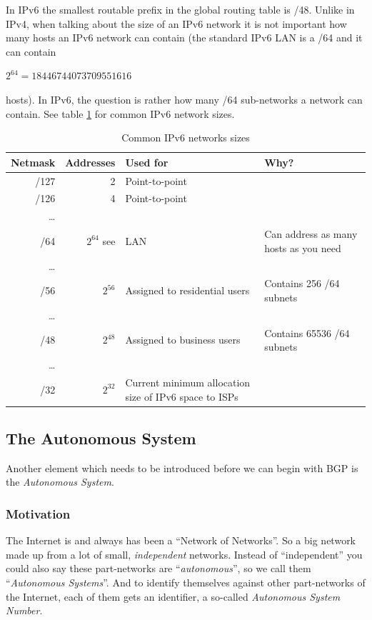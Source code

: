 In IPv6 the smallest routable prefix in the \gls{global routing table} is /48. Unlike in IPv4,
when talking about the size of an IPv6 network it is not important how many hosts
an IPv6 network can contain (the standard IPv6 LAN is a /64 and it can
contain
\begin{center}
  \(2^{64} = 18446744073709551616\)
\end{center}
hosts). In IPv6, the question is rather how many /64
sub-networks a network can contain. See table \ref{tab:ipv6sizes} for common IPv6
network sizes.
\begin{table}[hbp]
  \caption{Common IPv6 networks sizes}
  \label{tab:ipv6sizes}
  \begin{tabularx}{\textwidth}{rrXX}
    \textbf{Netmask} & \textbf{Addresses} & \textbf{Used for} & \textbf{Why?}\\
    \hline
    /127 & 2 & Point-to-point \\
    /126 & 4 & Point-to-point \\
    \ldots \\
    /64 & \(2^{64}\) see\footnotemark[1]& LAN & Can address as many
      hosts as you need\\
    \ldots \\
    /56 & \(2^{56}\) & Assigned to residential users & Contains 256 /64 subnets \\
    \ldots \\
    /48 & \(2^{48}\) & Assigned to business users & Contains 65536 /64 subnets \\
    \ldots\\
    /32 & \(2^{32}\) & Current minimum allocation size of IPv6 space to ISPs\\
  \end{tabularx}
\end{table}

\subsection{The Autonomous System}
Another element which needs to be introduced before we can begin with BGP is the
\emph{\gls{Autonomous System}}.

\subsubsection{Motivation}
The Internet is and always has been a ``Network of Networks''. So a big network made up from a lot of small, \emph{independent} networks. Instead of ``independent'' you could also say these part-networks are ``\emph{autonomous}'', so we call them ``\emph{Autonomous Systems}''. And to identify themselves against other part-networks of the Internet, each of them gets an identifier, a so-called \emph{Autonomous System Number}.

